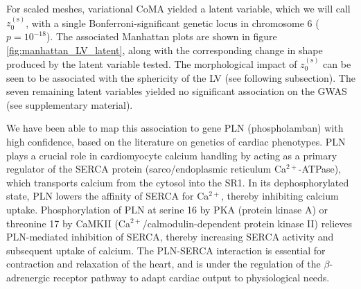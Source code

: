 For scaled meshes, variational CoMA yielded a latent variable, which we will call $z_0^{(\text{s})}$, with a single Bonferroni-significant genetic locus in chromosome 6 ($p=10^{-18}$). The associated Manhattan plots are shown in figure \ref{fig:manhattan_LV_latent}, along with the corresponding change in shape produced by the latent variable tested. The morphological impact of $z_0^{(\text{s})}$ can be seen to be associated with the sphericity of the LV (see following subsection). The seven remaining latent variables yielded no significant association on the GWAS (see supplementary material).

We have been able to map this association to gene PLN (phospholamban) with high confidence, based on the literature on genetics of cardiac phenotypes. 
PLN plays a crucial role in cardiomyocyte calcium handling by acting as a primary regulator of the SERCA protein (sarco/endoplasmic reticulum Ca$^{2+}$-ATPase), which transports calcium from the cytosol into the SR1. In its dephosphorylated state, PLN lowers the affinity of SERCA for Ca$^{2+}$, thereby inhibiting calcium uptake. Phosphorylation of PLN at serine 16 by PKA (protein kinase A) or threonine 17 by CaMKII (Ca$^{2+}$/calmodulin-dependent protein kinase II) relieves PLN-mediated inhibition of SERCA, thereby increasing SERCA activity and subsequent uptake of calcium. The PLN-SERCA interaction is essential for contraction and relaxation of the heart, and is under the regulation of the $\beta$-adrenergic receptor pathway to adapt cardiac output to physiological needs. \cite{maclennan_2003}


